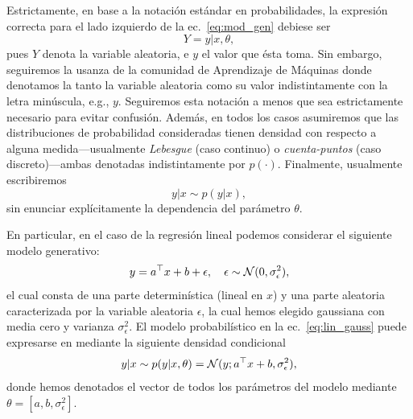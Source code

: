 \begin{mdframed}[style=discusion, frametitle={\center Notación sobre variables aleatorias}]
 Estrictamente, en base a la notación estándar en probabilidades, la expresión  correcta para el lado izquierdo de la ec.~\eqref{eq:mod_gen} debiese ser  
 \begin{equation}
  	Y=y|x,\theta,
  \end{equation}
  pues $Y$ denota la variable aleatoria, e $y$ el valor que ésta toma. Sin embargo, seguiremos la usanza de la comunidad de Aprendizaje de Máquinas donde denotamos la tanto la variable aleatoria como su valor indistintamente con la letra minúscula, e.g., $y$. Seguiremos esta notación a menos que sea estrictamente necesario para evitar confusión. Además, en todos los casos asumiremos que las distribuciones de probabilidad consideradas tienen densidad con respecto a alguna medida---usualmente \emph{Lebesgue} (caso continuo) o \emph{cuenta-puntos} (caso discreto)---ambas denotadas indistintamente por $p(\cdot)$.  Finalmente, usualmente escribiremos 
  \begin{equation}
  	y|x \sim p(y|x),
  \end{equation}
  sin enunciar explícitamente la dependencia del parámetro $\theta$.
\end{mdframed}


En particular, en el caso de la regresión lineal podemos considerar el siguiente modelo  generativo:
\begin{equation}
	y = a^\top x + b + \epsilon,\quad \epsilon\sim{\mathcal N}(0,\sigma_\epsilon^2),
	\label{eq:lin_gauss}
\end{equation}
el cual consta de una parte determinística (lineal en $x$) y una parte aleatoria caracterizada por la variable aleatoria $\epsilon$, la cual hemos  elegido gaussiana con media cero y varianza $\sigma_\epsilon^2$. El modelo probabilístico en la ec.~\eqref{eq:lin_gauss} puede expresarse en mediante la siguiente densidad condicional 
\begin{equation}
	y|x \sim p(y|x,\theta) = {\mathcal N}(y;a^\top x + b ,\sigma_\epsilon^2),\label{eq:mod_lin_gau}
\end{equation}
donde hemos denotados el vector de todos los parámetros del modelo mediante $\theta = [a,b,\sigma_\epsilon^2]$.

